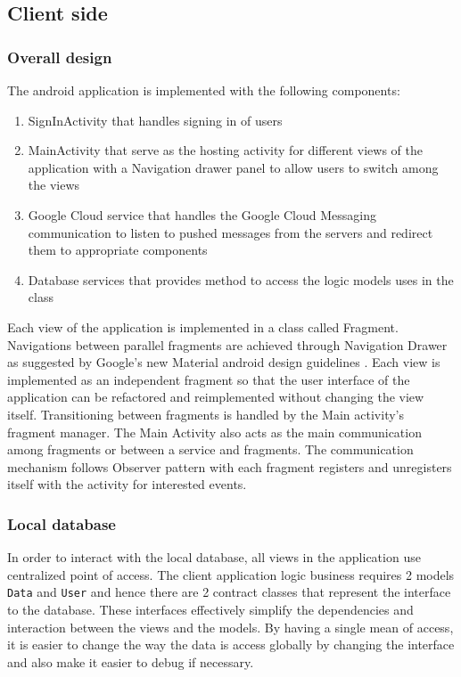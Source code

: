 \subsection{Client side}

\subsubsection{Overall design}
The android application is implemented with the following components:
\begin{enumerate}
    \item SignInActivity that handles signing in of users
    \item MainActivity that serve as the hosting activity for different views of the application with a Navigation
        drawer panel to allow users to switch among the views
    \item Google Cloud service that handles the Google Cloud Messaging communication to listen to pushed messages from
        the servers and redirect them to appropriate components
    \item Database services that provides method to access the logic models uses in the class
\end{enumerate}

Each view of the application is implemented in a class called Fragment.  Navigations between parallel fragments are
achieved through Navigation Drawer as suggested by Google's new Material android design guidelines
\cite{NavigationDrawerPattern}. Each view is implemented as an independent fragment so that the user interface of the
application can be refactored and reimplemented without changing the view itself.  Transitioning between fragments is
handled by the Main activity's fragment manager. The Main Activity also acts as the main communication among 
fragments or between a service and fragments. The communication mechanism follows Observer pattern
\cite{Gamma:1995:DPE:186897} with each fragment registers and unregisters itself with the activity for interested
events.

\subsubsection{Local database}
In order to interact with the local database, all views in the application use centralized point of access. The client
application logic business requires 2 models \texttt{Data} and \texttt{User} and hence there are 2 contract classes that
represent the interface to the database. These interfaces effectively simplify the dependencies and interaction between
the views and the models. By having a single mean of access, it is easier to change the way the data is access globally
by changing the interface and also make it easier to debug if necessary.

